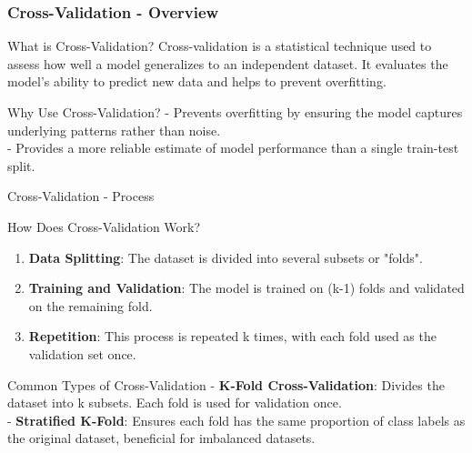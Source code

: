\documentclass[aspectratio=169]{beamer}
\begin{document}
\begin{frame}[fragile]
    \frametitle{Cross-Validation - Overview}
    \begin{block}{What is Cross-Validation?}
        Cross-validation is a statistical technique used to assess how well a model generalizes to an independent dataset. It evaluates the model's ability to predict new data and helps to prevent overfitting.
    \end{block}
    
    \begin{block}{Why Use Cross-Validation?}
        - Prevents overfitting by ensuring the model captures underlying patterns rather than noise.\\
        - Provides a more reliable estimate of model performance than a single train-test split.
    \end{block}
\end{frame}

\begin{frame}[fragile]{Cross-Validation - Process}
    \begin{block}{How Does Cross-Validation Work?}
        \begin{enumerate}
            \item \textbf{Data Splitting}: The dataset is divided into several subsets or "folds".
            \item \textbf{Training and Validation}: The model is trained on (k-1) folds and validated on the remaining fold.
            \item \textbf{Repetition}: This process is repeated k times, with each fold used as the validation set once.
        \end{enumerate}
    \end{block}

    \begin{block}{Common Types of Cross-Validation}
        - \textbf{K-Fold Cross-Validation}: Divides the dataset into k subsets. Each fold is used for validation once.\\
        - \textbf{Stratified K-Fold}: Ensures each fold has the same proportion of class labels as the original dataset, beneficial for imbalanced datasets.
    \end{block}
\end{frame}
\end{document}
